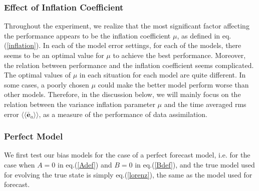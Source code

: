 \documentclass[twocolumn]{article}
\begin{document}
\subsubsection{Effect of Inflation Coefficient} \label{EffMu}
Throughout the experiment, we realize that the most significant factor affecting the performance appears to be the inflation coefficient $\mu$, as defined in eq.(\ref{inflation}). In each of the model error settings, for each of the models, there seems to be an optimal value for $\mu$ to achieve the best performance. Moreover, the relation between performance and the inflation coefficient seems complicated. The optimal values of $\mu$ in each situation for each model are quite different. In some cases, a poorly chosen $\mu$ could make the better model perform worse than other models. Therefore, in the discussion below, we will mainly focus on the relation between the variance inflation parameter $\mu$ and the time averaged rms error $\langle\langle\bar{\pmb{e}}_a\rangle\rangle$, as a measure of the performance of data assimilation.
\subsubsection{Perfect Model}
We first test our bias models for the case of a perfect forecast model, i.e. for the case when $A=0$ in eq.(\ref{Adef}) and $B=0$ in eq.(\ref{Bdef}), and the true model used for evolving the true state is simply eq.(\ref{lorenz}), the same as the model used for forecast.
\end{document}
